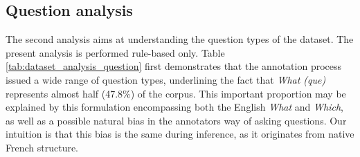 \documentclass{article}
\begin{document}
\begin{table}[ht]
    \centering
    \caption{Answer type by frequency for the development set of FQuAD1.1}
    \label{tab:dataset_analysis_answer}
\end{table}

\subsection{Question analysis}

The second analysis aims at understanding the question types of the dataset.
The present analysis is performed rule-based only.
Table \ref{tab:dataset_analysis_question} first demonstrates that the annotation process issued a wide range of question types, underlining the fact that \textit{What (que)} represents almost half (47.8\%) of the corpus. 
This important proportion may be explained by this formulation encompassing both the English \textit{What} and \textit{Which}, as well as a possible natural bias in the annotators way of asking questions. 
Our intuition is that this bias is the same during inference, as it originates from native French structure.
\end{document}

